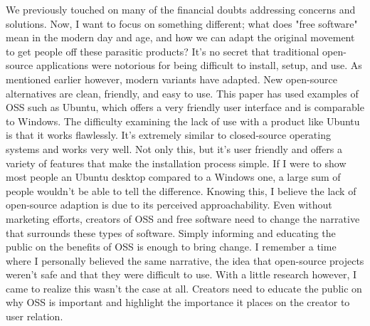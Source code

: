 \documentclass[11pt]{article}
\begin{document}
We previously touched on many of the financial doubts addressing concerns and solutions. Now, I want to focus on something different; what does "free software" mean in the modern day and age, and how we can adapt the original movement to get people off these parasitic products? It's no secret that traditional open-source applications were notorious for being difficult to install, setup, and use. As mentioned earlier however, modern variants have adapted. New open-source alternatives are clean, friendly, and easy to use. This paper has used examples of OSS such as Ubuntu, which offers a very friendly user interface and is comparable to Windows. The difficulty examining the lack of use with a product like Ubuntu is that it works flawlessly. It's extremely similar to closed-source operating systems and works very well. Not only this, but it's user friendly and offers a variety of features that make the installation process simple. If I were to show most people an Ubuntu desktop compared to a Windows one, a large sum of people wouldn't be able to tell the difference. Knowing this, I believe the lack of open-source adaption is due to its perceived approachability. Even without marketing efforts, creators of OSS and free software need to change the narrative that surrounds these types of software. Simply informing and educating the public on the benefits of OSS is enough to bring change. I remember a time where I personally believed the same narrative, the idea that open-source projects weren't safe and that they were difficult to use. With a little research however, I came to realize this wasn't the case at all. Creators need to educate the public on why OSS is important and highlight the importance it places on the creator to user relation.
\end{document}

